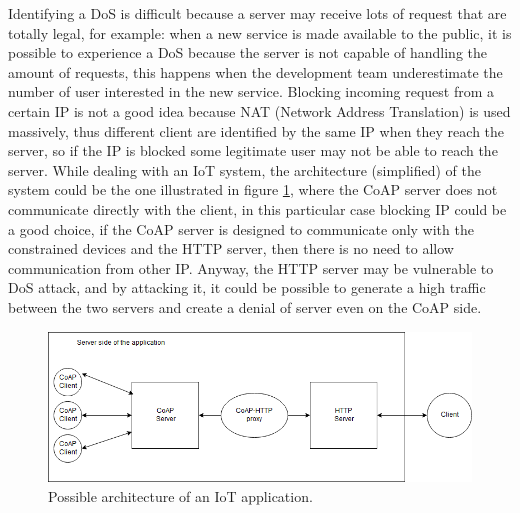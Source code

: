 	Identifying a DoS is difficult because a server may receive lots of request that are totally legal, for example: when a new service is made available to the public, it is possible to experience a DoS because the server is not capable of handling the amount of requests, this happens when the development team underestimate the number of user interested in the new service.\newline
	Blocking incoming request from a certain IP is not a good idea because NAT (Network Address Translation) is used massively, thus different client are identified by the same IP when they reach the server, so if the IP is blocked some legitimate user may not be able to reach the server.\newline
	While dealing with an IoT system, the architecture (simplified) of the system could be the one illustrated in figure \ref{fig:coap-vuln2}, where the CoAP server does not communicate directly with the client, in this particular case blocking IP could be a good choice, if the CoAP server is designed to communicate only with the constrained devices and the HTTP server, then there is no need to allow communication from other IP.\newline
	Anyway, the HTTP server may be vulnerable to DoS attack, and by attacking it, it could be possible to generate a high traffic between the two servers and create a denial of server even on the CoAP side.\newline
	
	\begin{figure}
		\includegraphics[width=\linewidth]{coap-vuln-img2.png}
		\caption{Possible architecture of an IoT application.}
		\label{fig:coap-vuln2}
	\end{figure}
	

